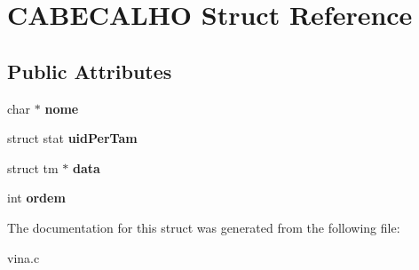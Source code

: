 \hypertarget{structCABECALHO}{\section{C\-A\-B\-E\-C\-A\-L\-H\-O Struct Reference}
\label{structCABECALHO}
}
\subsection*{Public Attributes}
\begin{DoxyCompactItemize}
\item 
\hypertarget{structCABECALHO_a5c294b2af7815f637adf6538cfa8e238}{char $\ast$ {\bfseries nome}}\label{structCABECALHO_a5c294b2af7815f637adf6538cfa8e238}

\item 
\hypertarget{structCABECALHO_a48bbd27da281fd78323d0ee40bbb883a}{struct stat {\bfseries uid\-Per\-Tam}}\label{structCABECALHO_a48bbd27da281fd78323d0ee40bbb883a}

\item 
\hypertarget{structCABECALHO_afe8adea15f2352be95b5ca01ed3fbd3d}{struct tm $\ast$ {\bfseries data}}\label{structCABECALHO_afe8adea15f2352be95b5ca01ed3fbd3d}

\item 
\hypertarget{structCABECALHO_ab53367a15a6e783708386aa662679dfc}{int {\bfseries ordem}}\label{structCABECALHO_ab53367a15a6e783708386aa662679dfc}

\end{DoxyCompactItemize}


The documentation for this struct was generated from the following file\-:\begin{DoxyCompactItemize}
\item 
vina.\-c\end{DoxyCompactItemize}
